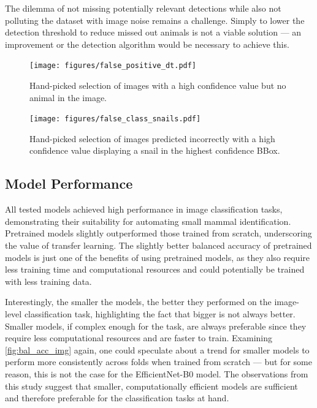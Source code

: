 The dilemma of not missing potentially relevant detections while also not polluting the dataset with image noise remains a challenge.
Simply to lower the detection threshold to reduce missed out animals is not a viable solution --- an improvement or the detection algorithm would be necessary to achieve this.

\begin{figure}[ht]
\centering
\texttt{[image: figures/false\_positive\_dt.pdf]}
\caption{Hand-picked selection of images with a high confidence value but no animal in the image.}
\label{fig:false_positive_dt}
\end{figure}

\begin{figure}[ht]
\centering
\texttt{[image: figures/false\_class\_snails.pdf]}
\caption{Hand-picked selection of images predicted incorrectly with a high confidence value displaying a snail in the highest confidence BBox.}
\label{fig:false_class_snails}
\end{figure}

\subsection{Model Performance}
All tested models achieved high performance in image classification tasks, demonstrating their suitability for automating small mammal identification.
Pretrained models slightly outperformed those trained from scratch, underscoring the value of transfer learning.
The slightly better balanced accuracy of pretrained models is just one of the benefits of using pretrained models, as they also require less training time and computational resources and could potentially be trained with less training data.

Interestingly, the smaller the models, the better they performed on the image-level classification task, highlighting the fact that bigger is not always better.
Smaller models, if complex enough for the task, are always preferable since they require less computational resources and are faster to train.
Examining \autoref{fig:bal_acc_img} again, one could speculate about a trend for smaller models to perform more consistently across folds when trained from scratch --- but for some reason, this is not the case for the EfficientNet-B0 model.
The observations from this study suggest that smaller, computationally efficient models are sufficient and therefore preferable for the classification tasks at hand.

